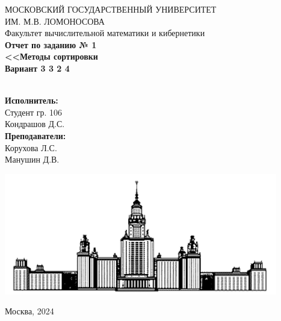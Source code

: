 \documentclass[a4paper,12pt]{article}
\begin{document}
    \begin{center}
        МОСКОВСКИЙ ГОСУДАРСТВЕННЫЙ УНИВЕРСИТЕТ \\
        ИМ. М.В. ЛОМОНОСОВА \\
        
        
        \hfill \break
        Факультет вычислительной математики и кибернетики\\
        \vspace{2.5cm}
        \Large{\textbf{Отчет по заданию № 1}}\\
        \vspace{0.5cm}
        \large{\textbf{<<Методы сортировки}}\\
        \vspace{0.5cm}
        \large{\textbf{Вариант 3 3 2 4}}\\
        \hfill \break
        \\
    \end{center}
    \begin{flushright}
        \textbf{Исполнитель:}\\ 
        Студент гр. 106\\
        Кондрашов Д.С.\\
        \textbf{Преподаватели:}\\ 
        Корухова Л.С.\\ 
        Манушин Д.В. \\

    \end{flushright}
    \vfill

    \begin{center}
        \includegraphics[width = 0.5\linewidth] {msu_logo}
    \end{center}
    \begin{center} 
        Москва, 2024 
    \end{center}
	\thispagestyle{empty} %

    \newpage
    \tableofcontents %

    \thispagestyle{empty} %

    \newpage
\end{document}
